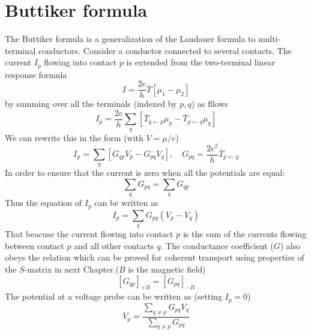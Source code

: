 \documentclass[11pt,a4paper]{book}
\theoremstyle{plain}
\theoremstyle{definition}
\theoremstyle{remark}
\begin{document}
\section{Buttiker formula}
The Buttiker formula is a generalization of the Landauer formula to multi-terminal conductors. Consider a conductor connected to several contacts. The current $I_p$ flowing into contact $p$ is extended from the two-terminal linear response formula
\begin{equation}
    I = \frac{2 e}{h} \overline{T} \left[ \mu_1 - \mu_2 \right]
\end{equation}
by summing over all the terminals (indexed by $p,q$) as fllows
\begin{equation}
    I_p = \frac{2 e}{h} \sum_q \left[ \overline{T}_{q \leftarrow p}\mu_p - \overline{T}_{p \leftarrow q}\mu_q \right]
\end{equation}
We can rewrite this in the form (with $V = \mu/e$)
\begin{equation}
    I_p = \sum_q \left[ G_{qp} V_p - G_{pq} V_q \right], \quad G_{pq} = \frac{2 e^2}{h} \overline{T}_{p \leftarrow q}
\end{equation}
In order to ensure that the current is zero when all the potentials are equal:
\begin{equation}
    \sum_q G_{pq} = \sum_q G_{qp}
\end{equation}
Thus the equation of $I_p$ can be written as
\begin{equation}
    I_p = \sum_q G_{pq} (V_p - V_q)
\end{equation}
That beacuse the current flowing into contact $p$ is the sum of the currents flowing between contact $p$ and all other contacts $q$. The conductance coefficient ($G$) also obeys the relation which can be proved for coherent transport using properties of the $S$-matrix in next Chapter.($B$ is the magnetic field)
\begin{equation}
    \left[G_{qp}\right]_{+B} = \left[G_{pq}\right]_{-B}
\end{equation}
The potential at a voltage probe can be written as (setting $I_p = 0$)
\begin{equation}
    V_p = \frac{\sum_{q \neq p} G_{pq} V_q}{\sum_{q \neq p} G_{pq}}
\end{equation}
\end{document}
